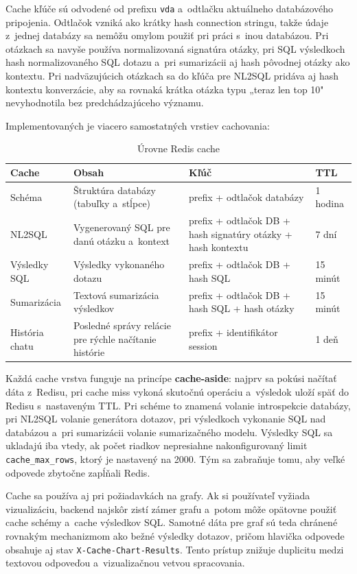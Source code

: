 \documentclass[a4paper, 12pt]{article}
\begin{document}
Cache kľúče sú odvodené od prefixu \texttt{vda} a~odtlačku aktuálneho databázového pripojenia. Odtlačok vzniká ako krátky hash connection stringu, takže údaje z~jednej databázy sa nemôžu omylom použiť pri práci s~inou databázou. Pri otázkach sa navyše používa normalizovaná signatúra otázky, pri SQL výsledkoch hash normalizovaného SQL dotazu a~pri sumarizácii aj hash pôvodnej otázky ako kontextu. Pri nadväzujúcich otázkach sa do kľúča pre NL2SQL pridáva aj hash kontextu konverzácie, aby sa rovnaká krátka otázka typu „teraz len top 10" nevyhodnotila bez predchádzajúceho významu.

Implementovaných je viacero samostatných vrstiev cachovania:

\begin{table}[H]
\centering
\small
\begin{tabular}{lp{4.2cm}p{4cm}p{2.2cm}}
\toprule
\textbf{Cache} & \textbf{Obsah} & \textbf{Kľúč} & \textbf{TTL} \\
\midrule
Schéma & Štruktúra databázy (tabuľky a~stĺpce) & prefix + odtlačok databázy & 1 hodina \\
NL2SQL & Vygenerovaný SQL pre danú otázku a~kontext & prefix + odtlačok DB + hash signatúry otázky + hash kontextu & 7 dní \\
Výsledky SQL & Výsledky vykonaného dotazu & prefix + odtlačok DB + hash SQL & 15 minút \\
Sumarizácia & Textová sumarizácia výsledkov & prefix + odtlačok DB + hash SQL + hash otázky & 15 minút \\
História chatu & Posledné správy relácie pre rýchle načítanie histórie & prefix + identifikátor session & 1 deň \\
\bottomrule
\end{tabular}
\caption{Úrovne Redis cache}
\end{table}

Každá cache vrstva funguje na princípe \textbf{cache-aside}: najprv sa pokúsi načítať dáta z~Redisu, pri cache miss vykoná skutočnú operáciu a~výsledok uloží späť do Redisu s~nastaveným TTL. Pri schéme to znamená volanie introspekcie databázy, pri NL2SQL volanie generátora dotazov, pri výsledkoch vykonanie SQL nad databázou a~pri sumarizácii volanie sumarizačného modelu. Výsledky SQL sa ukladajú iba vtedy, ak počet riadkov nepresiahne nakonfigurovaný limit \texttt{cache\_max\_rows}, ktorý je nastavený na 2000. Tým sa zabraňuje tomu, aby veľké odpovede zbytočne zapĺňali Redis.

Cache sa používa aj pri požiadavkách na grafy. Ak si používateľ vyžiada vizualizáciu, backend najskôr zistí zámer grafu a~potom môže opätovne použiť cache schémy a~cache výsledkov SQL. Samotné dáta pre graf sú teda chránené rovnakým mechanizmom ako bežné výsledky dotazov, pričom hlavička odpovede obsahuje aj stav \texttt{X-Cache-Chart-Results}. Tento prístup znižuje duplicitu medzi textovou odpoveďou a~vizualizačnou vetvou spracovania.
\end{document}
